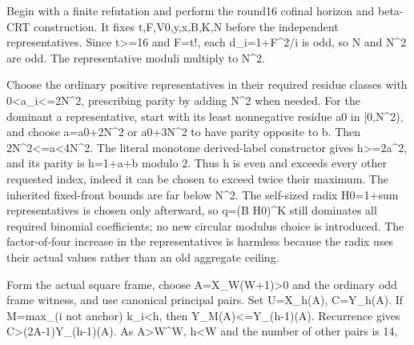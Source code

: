 Begin with a finite refutation and perform the round16 cofinal horizon and beta-CRT construction. It fixes t,F,V0,y,x,B,K,N before the independent representatives. Since t\textgreater{}\allowbreak{}=\allowbreak{}16 and F=\allowbreak{}t!, each d\_\allowbreak{}i=\allowbreak{}1+\allowbreak{}F\textasciicircum{}\allowbreak{}2/\allowbreak{}i is odd, so N and N\textasciicircum{}\allowbreak{}2 are odd. The representative moduli multiply to N\textasciicircum{}\allowbreak{}2.



Choose the ordinary positive representatives in their required residue classes with 0\textless{}\allowbreak{}a\_\allowbreak{}i\textless{}\allowbreak{}=\allowbreak{}2N\textasciicircum{}\allowbreak{}2, prescribing parity by adding N\textasciicircum{}\allowbreak{}2 when needed. For the dominant a representative, start with its least nonnegative residue a0 in [0,N\textasciicircum{}\allowbreak{}2), and choose a=\allowbreak{}a0+\allowbreak{}2N\textasciicircum{}\allowbreak{}2 or a0+\allowbreak{}3N\textasciicircum{}\allowbreak{}2 to have parity opposite to b. Then 2N\textasciicircum{}\allowbreak{}2\textless{}\allowbreak{}=\allowbreak{}a\textless{}\allowbreak{}4N\textasciicircum{}\allowbreak{}2. The literal monotone derived-label constructor gives h\textgreater{}\allowbreak{}=\allowbreak{}2a\textasciicircum{}\allowbreak{}2, and its parity is h=\allowbreak{}1+\allowbreak{}a+\allowbreak{}b modulo 2. Thus h is even and exceeds every other requested index, indeed it can be chosen to exceed twice their maximum. The inherited fixed-front bounds are far below N\textasciicircum{}\allowbreak{}2. The self-sized radix H0=\allowbreak{}1+\allowbreak{}sum representatives is chosen only afterward, so q=\allowbreak{}(B H0)\textasciicircum{}\allowbreak{}K still dominates all required binomial coefficients; no new circular modulus choice is introduced. The factor-of-four increase in the representatives is harmless because the radix uses their actual values rather than an old aggregate ceiling.



Form the actual square frame, choose A=\allowbreak{}X\_\allowbreak{}W(W+\allowbreak{}1)\textgreater{}\allowbreak{}0 and the ordinary odd frame witness, and use canonical principal pairs. Set U=\allowbreak{}X\_\allowbreak{}h(A), C=\allowbreak{}Y\_\allowbreak{}h(A). If M=\allowbreak{}max\_\allowbreak{}(i not anchor) k\_\allowbreak{}i\textless{}\allowbreak{}h, then Y\_\allowbreak{}M(A)\textless{}\allowbreak{}=\allowbreak{}Y\_\allowbreak{}(h-1)(A). Recurrence gives C\textgreater{}\allowbreak{}(2A-1)Y\_\allowbreak{}(h-1)(A). As A\textgreater{}\allowbreak{}W\textasciicircum{}\allowbreak{}W, h\textless{}\allowbreak{}W and the number of other pairs is 14,



